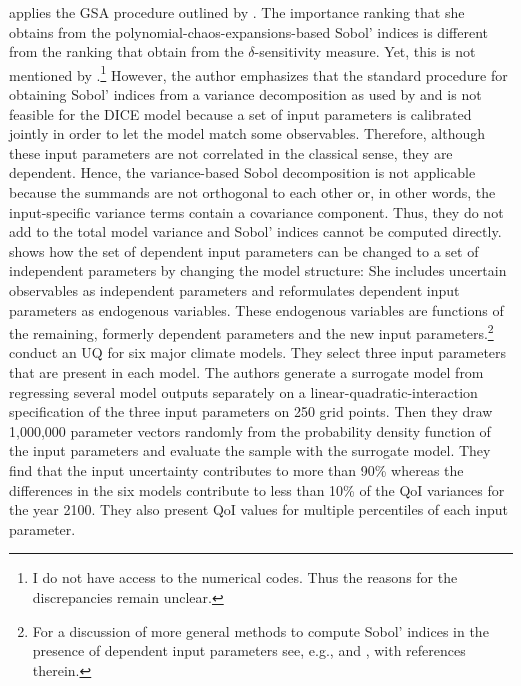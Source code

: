 \documentclass[a4paper,12pt]{article}
\begin{document}
\cite{Miftakhova.2018} applies the GSA procedure outlined by \cite{Harenberg.2019}. The importance ranking that she obtains from the polynomial-chaos-expansions-based Sobol' indices is different from the ranking that \cite{Anderson.2014} obtain from the $\delta$-sensitivity measure. Yet, this is not mentioned by \citeauthor{Miftakhova.2018}.\footnote{I do not have access to the numerical codes. Thus the reasons for the discrepancies remain unclear.} However, the author emphasizes that the standard procedure for obtaining Sobol' indices from a variance decomposition as used by \cite{Anderson.2014} and \cite{Butler.2014} is not feasible for the DICE model because a set of input parameters is calibrated jointly in order to let the model match some observables. Therefore, although these input parameters are not correlated in the classical sense, they are dependent. Hence, the variance-based Sobol decomposition is not applicable because the summands are not orthogonal to each other or, in other words, the input-specific variance terms contain a covariance component. Thus, they do not add to the total model variance and Sobol' indices cannot be computed directly. \cite{Miftakhova.2018} shows how the set of dependent input parameters can be changed to a set of independent parameters by changing the model structure: She includes uncertain observables as independent parameters and reformulates dependent input parameters as endogenous variables. These endogenous variables are functions of the remaining, formerly dependent parameters and the new input parameters.\footnote{For a discussion of more general methods to compute Sobol' indices in the presence of dependent input parameters see, e.g., \cite{Chastaing.2015} and \cite{Wiederkehr.2018}, with references therein.}\\
\newline
\cite{Gillingham.2015} conduct an UQ for six major climate models. They select three input parameters that are present in each model. The authors generate a surrogate model from regressing several model outputs separately on a linear-quadratic-interaction specification of the three input parameters on 250 grid points. Then they draw 1,000,000 parameter vectors randomly from the probability density function of the input parameters and evaluate the sample with the surrogate model. They find that the input uncertainty contributes to more than 90\% whereas the differences in the six models contribute to less than 10\% of the QoI variances for the year 2100. They also present QoI values for multiple percentiles of each input parameter.\\
\end{document}
